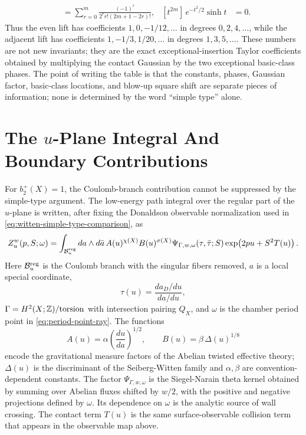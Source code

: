 \begin{example}
\begin{align}
  &=
  \sum_{r=0}^{m}
  \frac{(-1)^r}{2^r r!(2m+1-2r)!},
  &
  [t^{2m}]\,e^{-t^2/2}\sinh t
  &=0.
  \label{eq:donaldson-blowup-odd-lift-coefficients}
\end{align}
Thus the even lift has coefficients \(1,0,-1/12,\ldots\) in degrees
\(0,2,4,\ldots\), while the adjacent lift has coefficients \(1,-1/3,1/20,\ldots\)
in degrees \(1,3,5,\ldots\).  These numbers are not new invariants; they are
the exact exceptional-insertion Taylor coefficients obtained by multiplying
the contact Gaussian by the two exceptional basic-class phases.  The point of
writing the table is that the constants, phases, Gaussian factor, basic-class
locations, and blow-up square shift are separate pieces of information; none
is determined by the word ``simple type'' alone.
\end{example}

\section{The \texorpdfstring{\(u\)-Plane}{u-Plane} Integral And Boundary Contributions}

For \(b_2^+(X)=1\), the Coulomb-branch contribution cannot be suppressed by
the simple-type argument.  The low-energy path integral over the regular part
of the \(u\)-plane is written, after fixing the Donaldson observable
normalization used in \eqref{eq:witten-simple-type-comparison}, as
\begin{equation}
  Z_u^w(p,S;\omega)
  =
  \int_{\mathcal B_u^{\rm reg}}
  da\wedge d\bar a\,
  A(u)^{\chi(X)}B(u)^{\sigma(X)}
  \Psi_{\Gamma,w,\omega}(\tau,\bar\tau;S)
  \exp\!\left(2pu+S^2T(u)\right).
  \label{eq:u-plane-integral-data}
\end{equation}
Here \(\mathcal B_u^{\rm reg}\) is the Coulomb branch with the singular
fibers removed, \(a\) is a local special coordinate,
\[
  \tau(u)=\frac{da_D/du}{da/du},
\]
\(\Gamma=H^2(X;\mathbb Z)/{\rm torsion}\) with intersection pairing \(Q_X\),
and \(\omega\) is the chamber period point in
\eqref{eq:period-point-ray}.  The functions
\begin{equation}
  A(u)=\alpha\left(\frac{du}{da}\right)^{1/2},
  \qquad
  B(u)=\beta\,\Delta(u)^{1/8}
  \label{eq:u-plane-measure-factors}
\end{equation}
encode the gravitational measure factors of the Abelian twisted effective
theory; \(\Delta(u)\) is the discriminant of the Seiberg-Witten family and
\(\alpha,\beta\) are convention-dependent constants.  The factor
\(\Psi_{\Gamma,w,\omega}\) is the Siegel-Narain theta kernel obtained by
summing over Abelian fluxes shifted by \(w/2\), with the positive and
negative projections defined by \(\omega\).  Its dependence on \(\omega\) is
the analytic source of wall crossing.  The contact term \(T(u)\) is the same
surface-observable collision term that appears in the observable map above.

